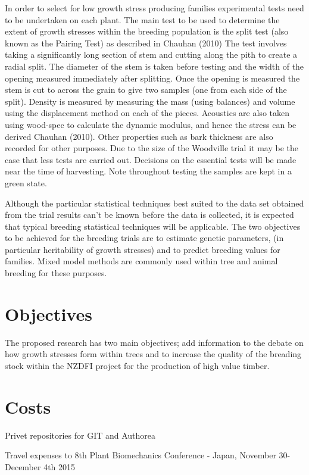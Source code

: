 \documentclass{article}
\begin{document}
In order to select for low growth stress producing families experimental tests
need to be undertaken on each plant. The main test to be used to determine the
extent of growth stresses within the breeding population is the split test (also
known as the Pairing Test) as described in Chauhan (2010) The test involves
taking a significantly long section of stem and cutting along the pith to create
a radial split. The diameter of the stem is taken before testing and the width
of the opening measured immediately after splitting. Once the opening is
measured the stem is cut to across the grain to give two samples (one from each
side of the split). Density is measured by measuring the mass (using balances)
and volume using the displacement method on each of the pieces. Acoustics are
also taken using wood-spec to calculate the dynamic modulus, and hence the
stress can be derived Chauhan (2010). Other properties such as bark thickness
are also recorded for other purposes. Due to the size of the Woodville trial it
may be the case that less tests are carried out. Decisions on the essential
tests will be made near the time of harvesting. Note throughout testing the
samples are kept in a green state.

Although the particular statistical techniques best suited to the data set
obtained from the trial results can’t be known before the data is collected, it
is expected that typical breeding statistical techniques will be applicable. The
two objectives to be achieved for the breeding trials are to estimate genetic
parameters, (in particular heritability of growth stresses) and to predict
breeding values for families. Mixed model methods are commonly used within tree
and animal breeding for these purposes.


\section{Objectives}
The proposed research has two main objectives; add information to the
debate on how growth stresses form within trees and to increase the quality of
the breading stock within the NZDFI project for the production of high value
timber.

\section{Costs}
Privet repositories for GIT and Authorea

Travel expenses to 8th Plant Biomechanics Conference - Japan, November
30-December 4th 2015
\end{document}
